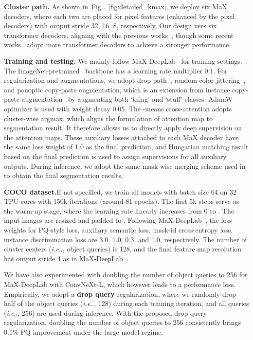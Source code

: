 \documentclass[runningheads]{llncs}
\makeatletter
\DeclareRobustCommand\onedot{\futurelet\@let@token\@onedot}
\def\@onedot{\ifx\@let@token.\else.\null\fi\xspace}
\def\ie{\emph{i.e}\onedot} \def\Ie{\emph{I.e}\onedot}
\newcommand{\figref}[1]{Fig\onedot~\ref{#1}}
\makeatother
\begin{document}
\textbf{Cluster path.}\quad
As shown in~\figref{fig:detailed_kmax}, we deploy six MaX decoders, where each two are placed for pixel features (enhanced by the pixel decoders) with output stride 32, 16, 8, respectively.
Our design uses six transformer decoders, aligning with the previous works~\cite{carion2020end,cheng2021per,yu2022cmt}, though some recent works~\cite{cheng2021masked,li2021panoptic} adopt more transformer decoders to achieve a stronger performance.

\textbf{Training and testing.}\quad
We mainly follow MaX-DeepLab~\cite{wang2021max} for training settings. The ImageNet-pretrained~\cite{russakovsky2015imagenet} backbone has a learning rate multiplier 0.1. For regularization and augmentations, we adopt drop path~\cite{huang2016deep}, random color jittering~\cite{cubuk2018autoaugment}, and panoptic copy-paste augmentation, which is an extension from instance copy-paste augmentation~\cite{fang2019instaboost,ghiasi2021simple} by augmenting both `thing' and `stuff' classes. AdamW~\cite{kingma2014adam,loshchilov2017decoupled}
optimizer is used with weight decay 0.05.
The -means cross-attention adopts cluster-wise argmax, which aligns the formulation of attention map to segmentation result.
It therefore allows us to directly apply deep supervision on the attention maps.
These auxiliary losses attached to each MaX decoder have the same loss weight of 1.0 as the final prediction, and Hungarian matching result based on the final prediction is used to assign supervisions for all auxiliary outputs.
During inference, we adopt the same mask-wise merging scheme used in~\cite{cheng2021per,zhang2021k,li2021panoptic,yu2022cmt} to obtain the final segmentation results. 

\textbf{COCO dataset.}\quad If not specified, we train all models with  batch size 64 on 32 TPU cores with 150k iterations (around 81 epochs). The first 5k steps serve as the warm-up stage, where the learning rate linearly increases from 0 to . The input images are resized and padded to .
Following MaX-DeepLab~\cite{wang2021max}, the loss weights for PQ-style loss, auxiliary semantic loss, mask-id cross-entropy loss, instance discrimination loss are 3.0, 1.0, 0.3, and 1.0, respectively. The number of cluster centers (\ie, object queries) is 128, and the final feature map resolution has output stride 4 as in MaX-DeepLab~\cite{wang2021max}.

We have also experimented with doubling the number of object queries to 256 for MaX-DeepLab with ConvNeXt-L, which however leads to a performance loss. Empirically, we adopt a \textbf{drop query} regularization, where we randomly drop half of the object queries (\ie, 128) during each training iteration, and all queries (\ie, 256) are used during inference. With the proposed drop query regularization, doubling the number of object queries to 256 consistently brings 0.1\% PQ improvement under the large model regime.
\end{document}
